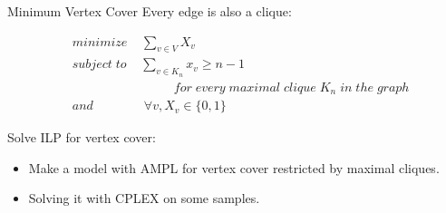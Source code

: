 \documentclass{beamer}
\begin{document}
\begin{frame}{Minimum Vertex Cover}
Every edge is also a clique:

 
\begin{align*}
&minimize \; \;\; \; \sum_{v\in V}X_v\\
&subject\; to \;\;\; \; \sum_{v\in K_n}x_v \geq n - 1\\
& \qquad\qquad \qquad\qquad for\; every\; maximal\; clique\; K_n\; in\; the\; graph\\
&and	\qquad\qquad	 \forall v, X_v\in \{0,1\}
\end{align*}

Solve ILP for vertex cover:
\begin{itemize}
\item Make a model with AMPL for vertex cover restricted by maximal cliques.
\item Solving it with CPLEX on some samples.
\end{itemize}

\end{frame}
\begin{comment}

\begin{frame}{Maximal Clique}


\begin{algorithm}[H]
\begin{algorithmic}[1]

\STATE BronKerbosch({$R, P, X$})\\

        \IF{$P$ and $X$ are both empty}{
        
		  	 report $R$ as a maximal clique\\	
		 }\ENDIF
		\FOR{vertex $v$ in $P$}{
		
			   BronKerbosch$(R \cup \{v\}, P \cap N(v), X \cap N(v))$
			   
			    $P := P\setminus \{v\}$
			    
			   	   $X := X\cup \{v\}$\\
		}\ENDFOR

\end{algorithmic}
\caption{Bron-Kerbosch}
\end{algorithm}

\end{frame}
\end{comment}
\end{document}
